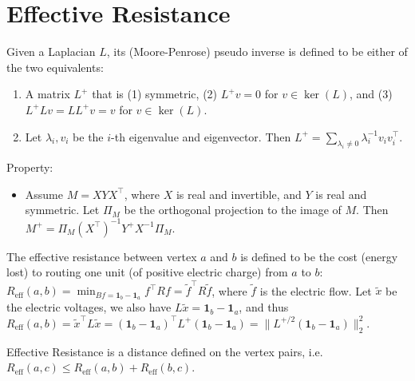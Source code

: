 \section{Effective Resistance}

Given a Laplacian $L$, its (Moore-Penrose) pseudo inverse is defined to be either of the two equivalents:
\begin{enumerate}
    \item A matrix $L^+$ that is (1) symmetric, (2) $L^+ v=0$ for $v \in \ker(L)$, and (3) $L^+ L v = L L^+ v = v$ for  $v \in \ker(L)$.
    \item Let $\lambda_i, v_i$ be the $i$-th eigenvalue and eigenvector. Then $L^+ = \sum_{\lambda_i \ne 0} \lambda_i^{-1} v_i v_i^\top$.
\end{enumerate}

Property:
\begin{itemize}
    \item Assume $M=X Y X^\top$, where $X$ is real and invertible, and $Y$ is real and symmetric. Let $\Pi_M$ be the orthogonal projection to the image of $M$. Then $M^+ = \Pi_M (X^\top)^{-1} Y^+ X^{-1} \Pi_M$.
\end{itemize}

The effective resistance between vertex $a$ and $b$ is defined to be the cost (energy lost) to routing one unit (of positive electric charge) from $a$ to $b$: $R_{\text{eff}}(a,b) = \min_{Bf = \boldsymbol{1}_b - \boldsymbol{1}_a} f^\top R f = \tilde{f}^\top R \tilde{f}$, where $\tilde{f}$ is the electric flow. Let $\tilde{x}$ be the electric voltages, we also have $L\tilde{x} = \boldsymbol{1}_b - \boldsymbol{1}_a$, and thus $R_{\text{eff}}(a,b) = \tilde{x}^\top L \tilde{x} = (\boldsymbol{1}_b - \boldsymbol{1}_a)^\top L^+ (\boldsymbol{1}_b - \boldsymbol{1}_a) = \|L^{+/2} (\boldsymbol{1}_b - \boldsymbol{1}_a)\|_2^2$.

Effective Resistance is a distance defined on the vertex pairs, i.e. $R_{\text{eff}}(a,c) \le R_{\text{eff}}(a,b) + R_{\text{eff}}(b,c)$.